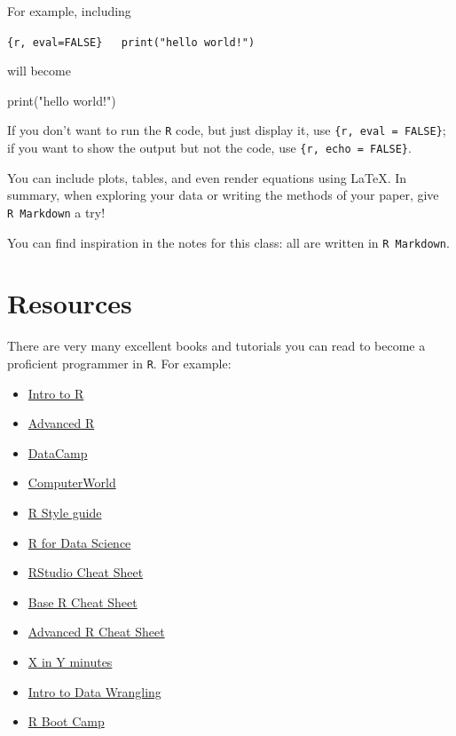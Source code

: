 \documentclass[
  letterpaper,
  DIV=11,
  numbers=noendperiod]{scrreprt}
\newenvironment{Shaded}{\begin{snugshade}}{\end{snugshade}}
\newcommand{\NormalTok}[1]{\textcolor[rgb]{0.00,0.23,0.31}{#1}}
\providecommand{\tightlist}{%
  \setlength{\itemsep}{0pt}\setlength{\parskip}{0pt}}\usepackage{longtable,booktabs,array}
\begin{document}
For example, including

\texttt{\{r,\ eval=FALSE\}\ \ \ print("hello\ world!")}

will become

\begin{Shaded}
\begin{Highlighting}[]
\NormalTok{print("hello world!")  }
\end{Highlighting}
\end{Shaded}

If you don't want to run the \texttt{R} code, but just display it, use
\texttt{\{r,\ eval\ =\ FALSE\}}; if you want to show the output but not
the code, use \texttt{\{r,\ echo\ =\ FALSE\}}.

You can include plots, tables, and even render equations using LaTeX. In
summary, when exploring your data or writing the methods of your paper,
give \texttt{R\ Markdown} a try!

You can find inspiration in the notes for this class: all are written in
\texttt{R\ Markdown}.

\section*{Resources}\label{resources}


There are very many excellent books and tutorials you can read to become
a proficient programmer in \texttt{R}. For example:

\begin{itemize}
\tightlist
\item
  \href{https://cran.r-project.org/doc/manuals/r-release/R-intro.html}{Intro
  to R}
\item
  \href{http://adv-r.had.co.nz/}{Advanced R}
\item
  \href{https://www.datacamp.com/courses/free-introduction-to-r}{DataCamp}
\item
  \href{https://www.computerworld.com/article/2497143/business-intelligence/business-intelligence-beginner-s-guide-to-r-introduction.html}{ComputerWorld}
\item
  \href{http://adv-r.had.co.nz/Style.html}{R Style guide}
\item
  \href{https://hackr.io/tutorial/r-for-data-science}{R for Data
  Science}
\item
  \href{https://github.com/rstudio/cheatsheets/raw/master/rstudio-ide.pdf}{RStudio
  Cheat Sheet}
\item
  \href{http://github.com/rstudio/cheatsheets/raw/master/base-r.pdf}{Base
  R Cheat Sheet}
\item
  \href{https://www.rstudio.com/wp-content/uploads/2016/02/advancedR.pdf}{Advanced
  R Cheat Sheet}
\item
  \href{https://learnxinyminutes.com/docs/r/}{X in Y minutes}
\item
  \href{https://cengel.github.io/R-data-wrangling/index.html}{Intro to
  Data Wrangling}
\item
  \href{https://r-bootcamp.netlify.app/}{R Boot Camp}
\end{itemize}
\end{document}
